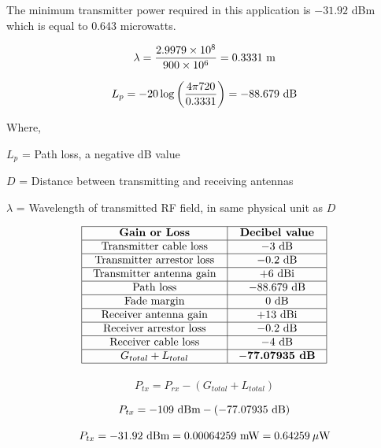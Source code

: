 





The minimum transmitter power required in this application is $-31.92$ dBm which is equal to 0.643 microwatts.







$$\lambda = {2.9979 \times 10^8 \over 900 \times 10^6} = 0.3331 \hbox{ m}$$

$$L_p = -20 \log \left(4 \pi 720 \over 0.3331\right) = -88.679 \hbox{ dB}$$

\noindent
Where,

$L_p$ = Path loss, a negative dB value

$D$ = Distance between transmitting and receiving antennas

$\lambda$ = Wavelength of transmitted RF field, in same physical unit as $D$

\vskip 10pt


$$\vbox{\offinterlineskip
\halign{\strut
\vrule \quad\hfil # \ \hfil & 
\vrule \quad\hfil # \ \hfil \vrule \cr
\noalign{\hrule}
%
{\bf Gain or Loss} & {\bf Decibel value} \cr
%
\noalign{\hrule}
%
Transmitter cable loss & $-3$ dB \cr
%
\noalign{\hrule}
%
Transmitter arrestor loss & $-0.2$ dB \cr
%
\noalign{\hrule}
%
Transmitter antenna gain & +6 dBi \cr
%
\noalign{\hrule}
%
Path loss & $-88.679$ dB \cr
%
\noalign{\hrule}
%
Fade margin & 0 dB \cr
%
\noalign{\hrule}
%
Receiver antenna gain & +13 dBi \cr
%
\noalign{\hrule}
%
Receiver arrestor loss & $-0.2$ dB \cr
%
\noalign{\hrule}
%
Receiver cable loss & $-4$ dB \cr
%
\noalign{\hrule}
%
$G_{total} + L_{total}$ & {\bf $-$77.07935 dB} \cr
%
\noalign{\hrule}
} %
}$$ %


\vskip 10pt

$$P_{tx} = P_{rx} - (G_{total} + L_{total})$$

$$P_{tx} = -109 \hbox{ dBm} - ( -77.07935 \hbox{ dB})$$

$$P_{tx} = -31.92 \hbox{ dBm} = 0.00064259 \hbox{ mW} = 0.64259 \> \mu\hbox{W}$$




